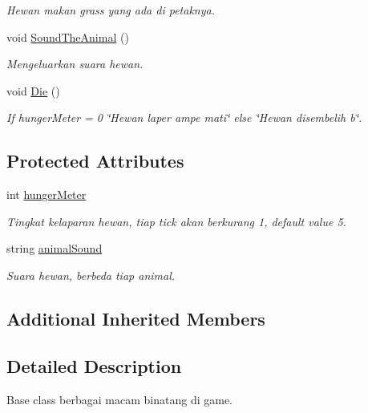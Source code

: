 \begin{DoxyCompactItemize}
\begin{DoxyCompactList}\small\item\em Hewan makan grass yang ada di petaknya. \end{DoxyCompactList}\item 
void \mbox{\hyperlink{classAnimal_a133f57a24e15741829d677c2602effd2}{Sound\+The\+Animal}} ()
\begin{DoxyCompactList}\small\item\em Mengeluarkan suara hewan. \end{DoxyCompactList}\item 
void \mbox{\hyperlink{classAnimal_a6af0b13eae4ab6758df22b3ac0908ecc}{Die}} ()
\begin{DoxyCompactList}\small\item\em If hunger\+Meter = 0 \char`\"{}\+Hewan laper ampe mati\char`\"{} else \char`\"{}\+Hewan disembelih b\char`\"{}. \end{DoxyCompactList}\end{DoxyCompactItemize}
\subsection*{Protected Attributes}
\begin{DoxyCompactItemize}
\item 
int \mbox{\hyperlink{classAnimal_a7b6c94227fc60ac60d5506fb5e857fd9}{hunger\+Meter}}
\begin{DoxyCompactList}\small\item\em Tingkat kelaparan hewan, tiap tick akan berkurang 1, default value 5. \end{DoxyCompactList}\item 
string \mbox{\hyperlink{classAnimal_a085fb0d50fc205ef61891e33c8dcb737}{animal\+Sound}}
\begin{DoxyCompactList}\small\item\em Suara hewan, berbeda tiap animal. \end{DoxyCompactList}\end{DoxyCompactItemize}
\subsection*{Additional Inherited Members}


\subsection{Detailed Description}
Base class berbagai macam binatang di game. 

